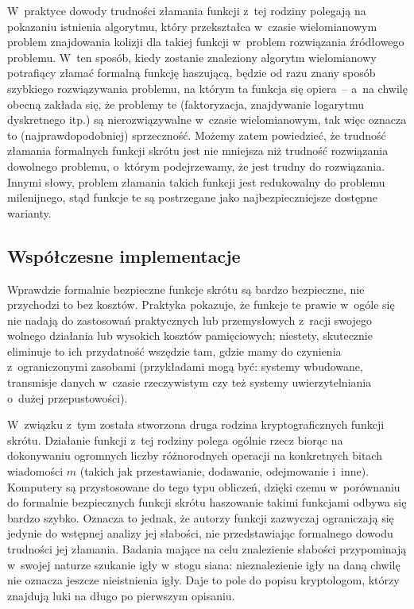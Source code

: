 W~praktyce dowody trudności złamania funkcji z~tej rodziny polegają na
pokazaniu istnienia algorytmu, który przekształca w~czasie wielomianowym
problem znajdowania kolizji dla takiej funkcji w~problem rozwiązania źródłowego
problemu. W~ten sposób, kiedy zostanie znaleziony algorytm wielomianowy
potrafiący złamać formalną funkcję haszującą, będzie od razu znany sposób
szybkiego rozwiązywania problemu, na którym ta funkcja się opiera~-- a~na
chwilę obecną zakłada się, że problemy te (faktoryzacja, znajdywanie logarytmu
dyskretnego itp.) są nierozwiązywalne w~czasie wielomianowym, tak więc oznacza
to (najprawdopodobniej) sprzeczność. Możemy zatem powiedzieć, że trudność
złamania formalnych funkcji skrótu jest nie mniejsza niż trudność rozwiązania
dowolnego problemu, o~którym podejrzewamy, że jest trudny do rozwiązania.
Innymi słowy, problem złamania takich funkcji jest redukowalny do problemu
milenijnego, stąd funkcje te są postrzegane jako najbezpieczniejsze dostępne
warianty.



\subsection{Współczesne implementacje}
Wprawdzie formalnie bezpieczne funkcje skrótu są bardzo bezpieczne, nie
przychodzi to bez kosztów. Praktyka pokazuje, że funkcje te prawie w~ogóle się
nie nadają do zastosowań praktycznych lub przemysłowych z~racji swojego wolnego
działania lub wysokich kosztów pamięciowych; niestety, skutecznie eliminuje to
ich przydatność wszędzie tam, gdzie mamy do czynienia z~ograniczonymi zasobami
(przykładami mogą być: systemy wbudowane, transmisje danych w~czasie
rzeczywistym czy też systemy uwierzytelniania o~dużej przepustowości).

W~związku z~tym została stworzona druga rodzina kryptograficznych funkcji
skrótu. Działanie funkcji z~tej rodziny polega ogólnie rzecz biorąc na
dokonywaniu ogromnych liczby różnorodnych operacji na konkretnych bitach
wiadomości $m$ (takich jak przestawianie, dodawanie, odejmowanie i~inne).
Komputery są przystosowane do tego typu obliczeń, dzięki czemu w~porównaniu do
formalnie bezpiecznych funkcji skrótu haszowanie takimi funkcjami odbywa się
bardzo szybko. Oznacza to jednak, że autorzy funkcji zazwyczaj ograniczają się
jedynie do wstępnej analizy jej słabości,  nie przedstawiając
formalnego dowodu trudności jej złamania. Badania mające na celu znalezienie
słabości przypominają w~swojej naturze szukanie igły w~stogu siana:
nieznalezienie igły na daną chwilę nie oznacza jeszcze nieistnienia igły. Daje
to pole do popisu kryptologom, którzy znajdują luki na długo po pierwszym
opisaniu.



